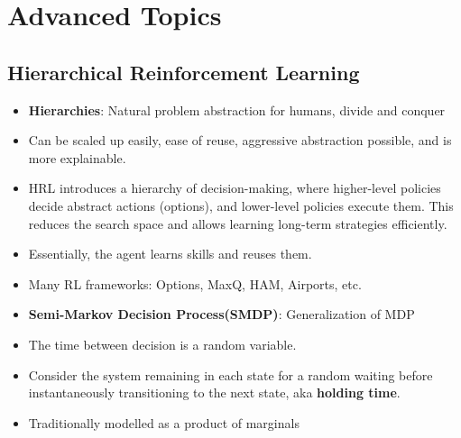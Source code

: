 \documentclass[a4paper]{article}
\begin{document}
\pagebreak
\section{Advanced Topics}
\subsection{Hierarchical Reinforcement Learning}
\begin{itemize}
    \item \textbf{Hierarchies}: Natural problem abstraction for humans, divide and conquer
    \item Can be scaled up easily, ease of reuse, aggressive abstraction possible, and is more explainable.
    \item HRL introduces a hierarchy of decision-making, where higher-level policies decide abstract actions (options), and lower-level policies execute them. This reduces the search space and allows learning long-term strategies efficiently.
    \item Essentially, the agent learns skills and reuses them.
    \item Many RL frameworks: Options, MaxQ, HAM, Airports, etc.
    \item \textbf{Semi-Markov Decision Process(SMDP)}: Generalization of MDP
    \item The time between decision is a random variable.
    \item Consider the system remaining in each state for a random waiting before instantaneously transitioning to the next state, aka \textbf{holding time}.
    \item Traditionally modelled as a product of marginals
    \begin{figure}[H]
        \centering
\end{figure}
\end{itemize}
\end{document}
